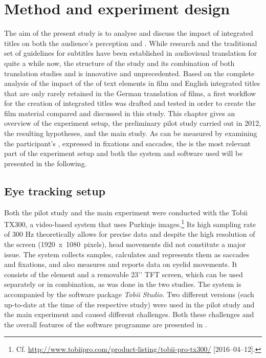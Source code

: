 \chapter{Method and experiment design}\label{method}

\largerpage
The aim of the present study is to analyse and discuss the impact of integrated titles on both the audience’s perception and . While  research and the traditional set of guidelines for subtitles have been established in audiovisual translation for quite a while now, the structure of the study and its combination of both translation studies and  is innovative and unprecedented. Based on the complete analysis of the impact of the  of text elements in film and English integrated titles that are only rarely retained in the German translation of films, a first workflow for the creation of integrated titles was drafted and tested in order to create the film material compared and discussed in this study. This chapter gives an overview of the experiment setup, the preliminary pilot study carried out in 2012, the resulting hypotheses, and the main study. As  can be measured by examining the participant’s , expressed in fixations and saccades, the  is the most relevant part of the experiment setup and both the system and software used will be presented in the following.

\section{{Eye tracking setup}}\label{sec:7.1}

Both the pilot study and the main experiment were conducted with the Tobii TX300, a video-based  system that uses Purkinje images.\footnote{Cf. \url{http://www.tobiipro.com/product-listing/tobii-pro-tx300/} [2016--04--12].} Its high sampling rate of 300 Hz theoretically allows for precise data and despite the high resolution of the screen (1920~x~1080~pixels), head movements did not constitute a major issue. The system collects  samples, calculates and represents them as saccades and fixations, and also measures  and reports data on eyelid movements. It consists of the  element and a removable 23’’ TFT screen, which can be used separately or in combination, as was done in the two studies. The system is accompanied by the software package \textit{Tobii Studio}. Two different versions (each up-to-date at the time of the respective study) were used in the pilot study and the main experiment and caused different challenges. Both these challenges and the overall features of the software programme are presented in .

